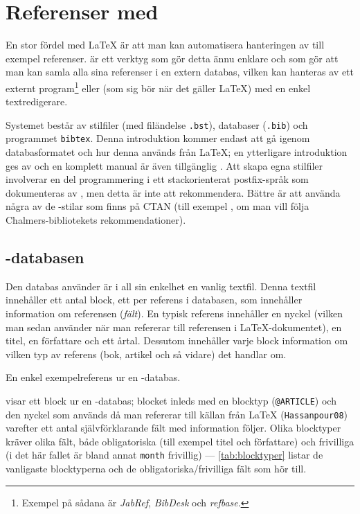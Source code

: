 \documentclass[lang=sv,ptsize=10pt,font=none,nomath,titles=bf,../../a4.tex]{subfiles}
\begin{document}
\section{Referenser med \BibTeX}\label{sec:5}
En stor fördel med \LaTeX{} är att man kan automatisera hanteringen av
till exempel referenser. \BibTeX{} är ett verktyg som gör detta ännu
enklare och som gör att man kan samla alla sina referenser i en extern
databas, vilken kan hanteras av ett externt program\footnote{Exempel på
sådana är \emph{JabRef}, \emph{BibDesk} och \emph{refbase}.\hfill} eller 
(som sig bör när det gäller \LaTeX) med en enkel textredigerare.

Systemet består av stilfiler (med filändelse \texttt{.bst}), databaser
(\texttt{.bib}) och programmet \texttt{bibtex}. Denna introduktion kommer
endast att gå igenom databasformatet och hur denna används från \LaTeX{}; 
en ytterligare introduktion ges av \textcite{Fenn06} och en komplett
manual är även tillgänglig \parencite{Patashnik88a}. Att skapa egna stilfiler
involverar en del programmering i ett stackorienterat postfix-språk som
dokumenteras av  \parencite{Patashnik88b}, men detta är inte att
rekommendera. Bättre är att använda några av de \BibTeX-stilar som finns
på CTAN (till exempel , om man vill följa 
Chalmers-bibliotekets rekommendationer).

\subsection{\BibTeX-databasen}
Den databas \BibTeX{} använder är i all sin enkelhet en vanlig textfil.
Denna textfil innehåller ett antal block, ett per referens i databasen,
som innehåller information om referensen (\emph{fält}). En typisk referens
innehåller en nyckel (vilken man sedan använder när man refererar till
referensen i \LaTeX-dokumentet), en titel, en författare och ett årtal.
Dessutom innehåller varje block information om vilken typ av referens 
(bok, artikel och så vidare) det handlar om. 

\begin{kod}[tbp]
	\centering
	\vfil\cprotect[mm]\vfil
	\caption{En enkel exempelreferens ur en \BibTeX-databas.}
	\label{ex:bibtex}
\end{kod}

 visar ett block ur en \BibTeX-databas; blocket
inleds med en blocktyp (\texttt{@ARTICLE}) och den nyckel som används då
man refererar till källan från \LaTeX{} (\texttt{Hassanpour08}) varefter
ett antal självförklarande fält med information följer. Olika blocktyper
kräver olika fält, både obligatoriska (till exempel titel och författare)
och frivilliga (i det här fallet är bland annat \texttt{month} frivillig)
— \cref{tab:blocktyper} listar de vanligaste blocktyperna och de
obligatoriska/frivilliga fält som hör till.
\end{document}
